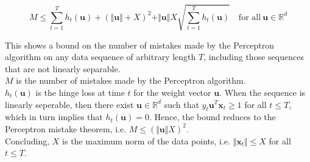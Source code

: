 \begin{itemize}
            $$
            M \leq \sum_{t=1}^{T} h_{t}(\boldsymbol{u}) + (\Vert \boldsymbol{u} \Vert + X)^2 + \Vert \boldsymbol{u} \Vert X \sqrt{\sum_{t=1}^{T}h_t (\boldsymbol{u})} \quad \text{for all}\ \boldsymbol{u} \in \mathbb{R}^d    
            $$
            
            This shows a bound on the number of mistakes made by the Perceptron algorithm on any data sequence of arbitrary length $T$, including those sequences that are not linearly separable.\\
            
            $M$ is the number of mistakes made by the Perceptron algorithm.\\
            $h_{t}(\boldsymbol{u})$ is the hinge loss at time $t$ for the weight vector $\boldsymbol{u}$. When the sequence is linearly seperable, then there exist $\boldsymbol{u} \in \mathbb{R}^d$ such that $y_{t} \boldsymbol{u}^T \boldsymbol{x}_{t} \geq 1$ for all $t \leq T$, which in turn implies that $h_{t}(\boldsymbol{u}) = 0$. Hence, the bound reduces to the Perceptron mistake theorem, i.e. $M \leq (\Vert \boldsymbol{u} \Vert X)^2$.\\
            Concluding, $X$ is the maximum norm of the data points, i.e. $\Vert \boldsymbol{x}_{t} \Vert \leq X$ for all $t \leq T$.
\end{itemize}
